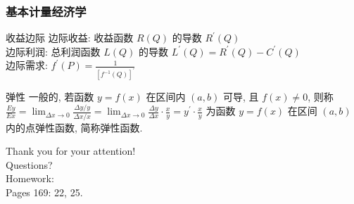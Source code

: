 \documentclass[
10pt,
aspectratio=43,
]{beamer}
\begin{document}
\begin{frame}
	\frametitle{基本计量经济学}
	\everymath{\displaystyle}
	\begin{block}{收益边际}
		边际收益: 收益函数 $R(Q)$ 的导数 $R^{\prime}(Q)$\\
		\pause
		边际利润: 总利润函数 $L(Q)$ 的导数 $L^{\prime}(Q)=R^{\prime}(Q)-C^{\prime}(Q)$\\
		\pause
		边际需求:  $f^{\prime}(P)=\frac{1}{\left[f^{-1}(Q)\right]^{\prime}}$
	\end{block}

	\begin{block}{弹性}
		一般的, 若函数 $y=f(x)$ 在区间内 $(a, b)$ 可导, 且 $f(x) \neq 0$, 则称 $\frac{E y}{E x}=\lim _{\Delta x \rightarrow 0} \frac{\Delta y / y}{\Delta x / x}=\lim _{\Delta x \rightarrow 0} \frac{\Delta y}{\Delta x} \cdot \frac{x}{y}=y^{\prime} \cdot \frac{x}{y}$ 为函数 $y=f(x)$ 在区间 $(a, b)$ 内的点弹性函数, 简称弹性函数.
	\end{block}
\end{frame}

\begin{frame}[plain]
	\vfill
	\centering
	{
		\centering \Huge \color{white} Thank you for your attention!\\[10pt]Questions?\\ Homework: \\\vspace{0.2cm}Pages 169: 22, 25.
	}
	\vfill
\end{frame}
\end{document}

